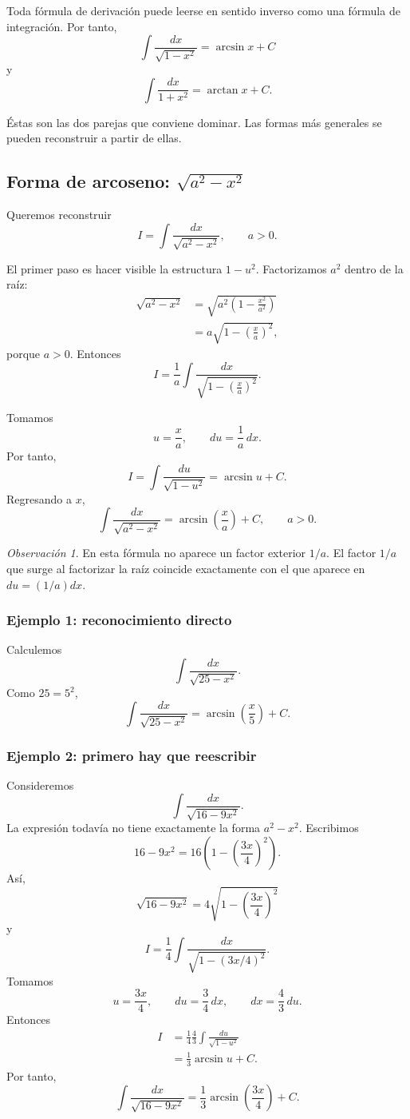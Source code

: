 \documentclass[12pt]{article}
\theoremstyle{definition}
\theoremstyle{remark}
\newtheorem*{observacion}{Observación}
\begin{document}
Toda fórmula de derivación puede leerse en sentido inverso como una fórmula
de integración. Por tanto,
\[
\boxed{\int\frac{dx}{\sqrt{1-x^2}}=\arcsin x+C}
\]
y
\[
\boxed{\int\frac{dx}{1+x^2}=\arctan x+C.}
\]

Éstas son las dos parejas que conviene dominar. Las formas más generales se
pueden reconstruir a partir de ellas.

\subsection{Forma de arcoseno: \texorpdfstring{$\sqrt{a^2-x^2}$}{sqrt(a2-x2)}}

Queremos reconstruir
\[
I=\int\frac{dx}{\sqrt{a^2-x^2}},\qquad a>0.
\]

El primer paso es hacer visible la estructura $1-u^2$. Factorizamos $a^2$
dentro de la raíz:
\begin{align*}
\sqrt{a^2-x^2}
&=\sqrt{a^2\left(1-\frac{x^2}{a^2}\right)}\\
&=a\sqrt{1-\left(\frac{x}{a}\right)^2},
\end{align*}
porque $a>0$. Entonces
\[
I=\frac1a\int
\frac{dx}{\sqrt{1-\left(\frac{x}{a}\right)^2}}.
\]

Tomamos
\[
u=\frac{x}{a},\qquad du=\frac1a\,dx.
\]
Por tanto,
\[
I=\int\frac{du}{\sqrt{1-u^2}}
=\arcsin u+C.
\]
Regresando a $x$,
\[
\boxed{\int\frac{dx}{\sqrt{a^2-x^2}}
=\arcsin\left(\frac{x}{a}\right)+C,\qquad a>0.}
\]

\begin{observacion}
En esta fórmula no aparece un factor exterior $1/a$. El factor $1/a$ que
surge al factorizar la raíz coincide exactamente con el que aparece en
$du=(1/a)dx$.
\end{observacion}

\subsubsection*{Ejemplo 1: reconocimiento directo}
Calculemos
\[
\int\frac{dx}{\sqrt{25-x^2}}.
\]
Como $25=5^2$,
\[
\int\frac{dx}{\sqrt{25-x^2}}
=\boxed{\arcsin\left(\frac{x}{5}\right)+C}.
\]

\subsubsection*{Ejemplo 2: primero hay que reescribir}
Consideremos
\[
\int\frac{dx}{\sqrt{16-9x^2}}.
\]
La expresión todavía no tiene exactamente la forma $a^2-x^2$. Escribimos
\[
16-9x^2=16\left(1-\left(\frac{3x}{4}\right)^2\right).
\]
Así,
\[
\sqrt{16-9x^2}=4\sqrt{1-\left(\frac{3x}{4}\right)^2}
\]
y
\[
I=\frac14\int\frac{dx}{\sqrt{1-(3x/4)^2}}.
\]
Tomamos
\[
u=\frac{3x}{4},\qquad du=\frac34\,dx,
\qquad dx=\frac43\,du.
\]
Entonces
\begin{align*}
I
&=\frac14\frac43\int\frac{du}{\sqrt{1-u^2}}\\
&=\frac13\arcsin u+C.
\end{align*}
Por tanto,
\[
\boxed{\int\frac{dx}{\sqrt{16-9x^2}}
=\frac13\arcsin\left(\frac{3x}{4}\right)+C.}
\]
\end{document}
